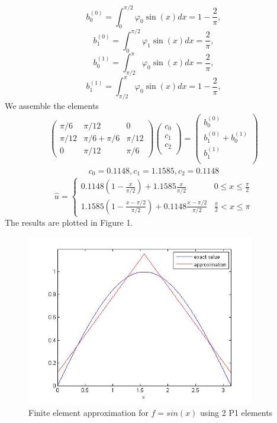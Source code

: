 \documentclass{article}
\begin{document}
\begin{equation*}
b_{0}^{(0)}=\displaystyle\int^{\pi/2}_{0}{\varphi}_{0}\sin(x)dx=1-\frac{2}{\pi},
\end{equation*}
\begin{equation*}
b_{1}^{(0)}=\displaystyle\int^{\pi/2}_{0}{\varphi}_{1}\sin(x)dx=\frac{2}{\pi},
\end{equation*}
\begin{equation*}
b_{0}^{(1)}=\displaystyle\int^{\pi}_{\pi/2}{\varphi}_{0}\sin(x)dx=\frac{2}{\pi},
\end{equation*}
\begin{equation*}
b_{1}^{(1)}=\displaystyle\int^{\pi}_{\pi/2}{\varphi}_{0}\sin(x)dx=1-\frac{2}{\pi},
\end{equation*}
We assemble the elements
\begin{gather*}
\begin{pmatrix}
\pi/6 & \pi/12 &0\\
\pi/12 & \pi/6+\pi/6 &\pi/12\\
0 &\pi/12  &\pi/6
\end{pmatrix}
\begin{pmatrix}
c_{0}\\
c_{1}\\
c_{2}\\
\end{pmatrix}=
\begin{pmatrix}
b_{0}^{(0)}\\
b_{1}^{(0)}+b_{0}^{(1)}\\
b_{1}^{(1)}\\
\end{pmatrix}
\end{gather*}
\begin{gather}
c_{0}=0.1148, c_{1}=1.1585, c_{2}=0.1148
\end{gather}
\begin{equation}
\hat{u}=
\begin{cases}
0.1148(1-\displaystyle\frac{x}{\pi/2})+1.1585 \displaystyle\frac{x}{\pi/2}& \text{$\displaystyle 0 \leq x \leq \frac{\pi}{2}$}\\
1.1585(1-\displaystyle\frac{x-\pi/2}{\pi/2})+0.1148 \displaystyle\frac{x-\pi/2}{\pi/2}& \text{$\displaystyle \frac{\pi}{2}< x \leq \pi$}
\end{cases}
\end{equation}
The results are plotted in Figure 1.
\begin{figure}[H]
\begin{center}
\includegraphics[width=10cm]{ex10.jpg}    %
\caption{Finite element approximation for $f=sin(x)$ using 2 P1 elements}
\end{center}
\end{figure}
\end{document}

